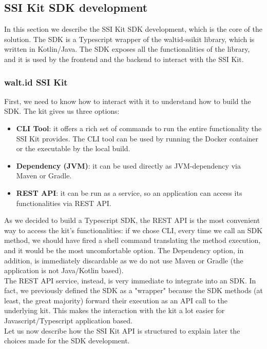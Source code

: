 \subsection{SSI Kit SDK development}
In this section we describe the SSI Kit SDK development, which is the core of the
solution. The SDK is a Typescript wrapper of the waltid-ssikit library, which is
written in Kotlin/Java. The SDK exposes all the functionalities of the library,
and it is used by the frontend and the backend to interact with the SSI Kit.

\subsubsection{walt.id SSI Kit}
First, we need to know how to interact with it to understand how to build the SDK.
The kit gives us three options:
\begin{itemize}
    \item \textbf{CLI Tool}: it offers a rich set of commands to run the entire functionality 
    the SSI Kit provides. The CLI tool can be used by running the Docker container or
    the executable by the local build.
    \item \textbf{Dependency (JVM)}: it can be used directly as JVM-dependency via Maven or 
    Gradle.
    \item \textbf{REST API}: it can be run as a service, so an application can access its 
    functionalities via REST API.
\end{itemize}
As we decided to build a Typescript SDK, the REST API is the most convenient way 
to access the kit's functionalities: if we chose CLI, every time we call an SDK 
method,  we should have fired a shell command translating the method execution, and 
it would be the most uncomfortable option. The Dependency option, in addition, is 
immediately discardable as we do not use Maven or Gradle (the application is not 
Java/Kotlin based).\\
The REST API service, instead, is very immediate to integrate into an SDK.
In fact, we previously defined the SDK as a "wrapper" because the SDK methods (at 
least, the great majority) forward their execution as an API call to the underlying 
kit. This makes the interaction with the kit a lot easier for Javascript/Typescript 
application based.
\vspace*{0.3cm}\\
Let us now describe how the SSI Kit API is structured to explain later the choices 
made for the SDK development.
